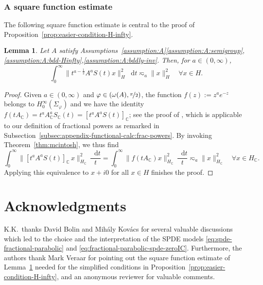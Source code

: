 \documentclass[reqno]{amsart}
\numberwithin{equation}{section}
\newcommand{\C}{\mathbb{C}}
\newcommand{\norm}[2]{     \| #1       \|_{ #2 }}
\newcommand{\rd}{\mathop{}\!\mathrm{d}}
\newtheorem{lemma}{Lemma}[section]
\theoremstyle{remark}
\theoremstyle{definition}
\begin{document}
\subsubsection{A square function estimate}\label{subsubsec:square-estimate}  

The following square function estimate is central to the proof of
Proposition~\ref{prop:easier-condition-H-infty}. 

\begin{lemma}\label{lem:square-func-est}
	Let $A$ satisfy 
	Assumptions~\textup{\ref{assumption:A}\ref{assumption:A:semigroup},\ref{assumption:A:bdd-Hinfty},\ref{assumption:A:bddly-inv}}.
	Then, for $a \in (0,\infty)$,
	\[
	\int_0^\infty 
	\bigl\| t^{a-\frac{1}{2}}A^a S(t) x \bigr\|_{H}^2 \rd t 
	\eqsim_{a}
	\norm{x}{H}^2 
	\quad \forall x \in H.
	\]
\end{lemma} 

\begin{proof}
	Given $a \in(0,\infty)$ 
	and $\varphi\in (\omega(A),\nicefrac{\pi}{2})$, 
	the function
	$f(z) := z^a e^{-z}$ belongs to 
	$H^\infty_0(\Sigma_{\varphi})$ 
	and we have the identity 
	$f(t A_\C)
	=
	t^a A_\C^a S_\C(t)
	=
	[t^a A^a S(t)]_\C$; 
	see the proof of \cite[Proposition~3.4.3]{Haase2006},
	which is applicable to our definition of fractional powers 
	as remarked
	in Subsection~\ref{subsec:appendix-functional-calc:frac-powers}. 
	By invoking Theorem~\ref{thm:mcintosh}, we thus find 
	\[
	\int_0^\infty 
	\bigl\| [t^a A^a S(t)]_\C \, x \bigr\|_{H_\C}^2 \, \frac{\rd t}{t} 
	= \int_0^\infty 
	\bigl\| f(tA_\C) x \bigr\|_{H_\C}^2 \, \frac{\rd t}{t} 
	\eqsim_{a}
	\| x \|_{H_\C}^2 
	\quad 
	\forall x \in H_\C.
	\]
	Applying this equivalence to $x + i0$ for all $x \in H$ finishes the proof.
\end{proof}
 

 
 
\section*{Acknowledgments}

K.K.\ thanks David Bolin and 
Mih\'aly Kov\'acs for several valuable discussions 
which led to the choice and the interpretation of 
the SPDE models \eqref{eq:spde-fractional-parabolic} and 
\eqref{eq:fractional-parabolic-spde-zeroIC}. 
Furthermore, the authors thank 
Mark Veraar for pointing out the 
square function estimate 
of Lemma~\ref{lem:square-func-est} 
needed for the simplified conditions 
in Proposition~\ref{prop:easier-condition-H-infty}, 
and an anonymous reviewer
for valuable comments. 
\end{document}

